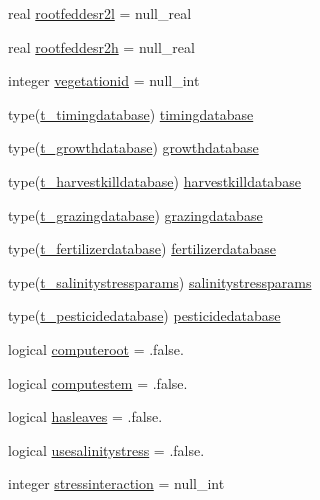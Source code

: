 \begin{DoxyCompactItemize}
real \mbox{\hyperlink{structmodulevegetation_1_1t__vegetationtype_ab01a210b6f8fddd4182f649f346aeadc}{rootfeddesr2l}} = null\+\_\+real
\item 
real \mbox{\hyperlink{structmodulevegetation_1_1t__vegetationtype_a27a64c2d94f834e4f6bdb1ca74a983d1}{rootfeddesr2h}} = null\+\_\+real
\item 
integer \mbox{\hyperlink{structmodulevegetation_1_1t__vegetationtype_a93d2866cfd88c958c964dae5a819cd8b}{vegetationid}} = null\+\_\+int
\item 
type(\mbox{\hyperlink{structmodulevegetation_1_1t__timingdatabase}{t\+\_\+timingdatabase}}) \mbox{\hyperlink{structmodulevegetation_1_1t__vegetationtype_af3df067d3e1f1a64b0ebd3b68dc59cc8}{timingdatabase}}
\item 
type(\mbox{\hyperlink{structmodulevegetation_1_1t__growthdatabase}{t\+\_\+growthdatabase}}) \mbox{\hyperlink{structmodulevegetation_1_1t__vegetationtype_a49fe4611c13e812efccbc2362bfb79e2}{growthdatabase}}
\item 
type(\mbox{\hyperlink{structmodulevegetation_1_1t__harvestkilldatabase}{t\+\_\+harvestkilldatabase}}) \mbox{\hyperlink{structmodulevegetation_1_1t__vegetationtype_ad3339540580b2381ab0ca785207bdd3b}{harvestkilldatabase}}
\item 
type(\mbox{\hyperlink{structmodulevegetation_1_1t__grazingdatabase}{t\+\_\+grazingdatabase}}) \mbox{\hyperlink{structmodulevegetation_1_1t__vegetationtype_ad36bd3877fef9e3725d0d18fa089c26e}{grazingdatabase}}
\item 
type(\mbox{\hyperlink{structmodulevegetation_1_1t__fertilizerdatabase}{t\+\_\+fertilizerdatabase}}) \mbox{\hyperlink{structmodulevegetation_1_1t__vegetationtype_ae215bdf8ddc237924e35b6e686a760f2}{fertilizerdatabase}}
\item 
type(\mbox{\hyperlink{structmodulevegetation_1_1t__salinitystressparams}{t\+\_\+salinitystressparams}}) \mbox{\hyperlink{structmodulevegetation_1_1t__vegetationtype_a982e55098e62e47012aab086992067aa}{salinitystressparams}}
\item 
type(\mbox{\hyperlink{structmodulevegetation_1_1t__pesticidedatabase}{t\+\_\+pesticidedatabase}}) \mbox{\hyperlink{structmodulevegetation_1_1t__vegetationtype_a7f920cbd7d71749238538f9766d4ed73}{pesticidedatabase}}
\item 
logical \mbox{\hyperlink{structmodulevegetation_1_1t__vegetationtype_ad2ac9d84a432b171e4064d684f830e33}{computeroot}} = .false.
\item 
logical \mbox{\hyperlink{structmodulevegetation_1_1t__vegetationtype_a97f9df8cbcd78865a8c89a063a499ab8}{computestem}} = .false.
\item 
logical \mbox{\hyperlink{structmodulevegetation_1_1t__vegetationtype_acb46c9dc1534cf3648e39b4edf43f02c}{hasleaves}} = .false.
\item 
logical \mbox{\hyperlink{structmodulevegetation_1_1t__vegetationtype_a0dbaf195000ced44193c61337aec8c9c}{usesalinitystress}} = .false.
\item 
integer \mbox{\hyperlink{structmodulevegetation_1_1t__vegetationtype_a50256b7bee477b506d6233c1a1602d43}{stressinteraction}} = null\+\_\+int
\end{DoxyCompactItemize}


